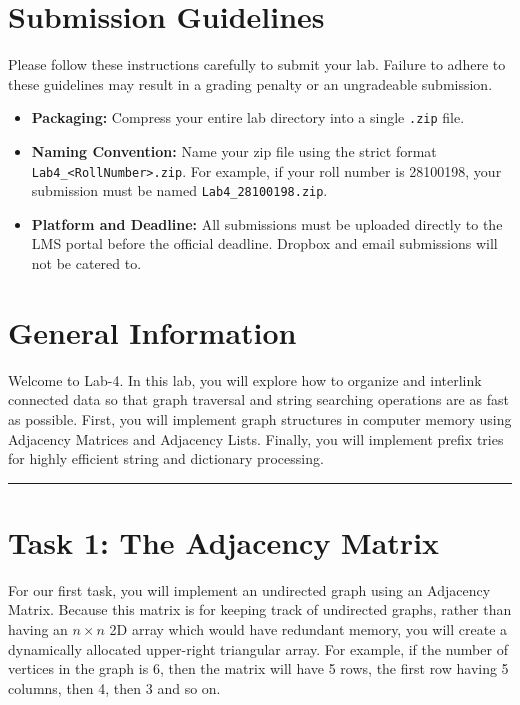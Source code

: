 \documentclass[11pt]{article}
\begin{document}
\section{Submission Guidelines}
Please follow these instructions carefully to submit your lab. Failure to adhere to these guidelines may result in a grading penalty or an ungradeable submission.
\begin{itemize}
    \item \textbf{Packaging:} Compress your entire lab directory into a single \texttt{.zip} file.
    \item \textbf{Naming Convention:} Name your zip file using the strict format \texttt{Lab4\_<RollNumber>.zip}. For example, if your roll number is 28100198, your submission must be named \texttt{Lab4\_28100198.zip}.
    \item \textbf{Platform and Deadline:} All submissions must be uploaded directly to the LMS portal before the official deadline. Dropbox and email submissions will not be catered to.
\end{itemize}

\newpage

\section{General Information}
Welcome to Lab-4. In this lab, you will explore how to organize and interlink connected data so that graph traversal and string searching operations are as fast as possible. First, you will implement graph structures in computer memory using Adjacency Matrices and Adjacency Lists. Finally, you will implement prefix tries for highly efficient string and dictionary processing.

\vspace{1em}
\noindent\rule{\textwidth}{0.4pt}
\vspace{1em}


\newpage
\section{Task 1: The Adjacency Matrix}
For our first task, you will implement an undirected graph using an Adjacency Matrix. Because this matrix is for keeping track of undirected graphs, rather than having an $n \times n$ 2D array which would have redundant memory, you will create a dynamically allocated upper-right triangular array. For example, if the number of vertices in the graph is 6, then the matrix will have 5 rows, the first row having 5 columns, then 4, then 3 and so on.
\end{document}
